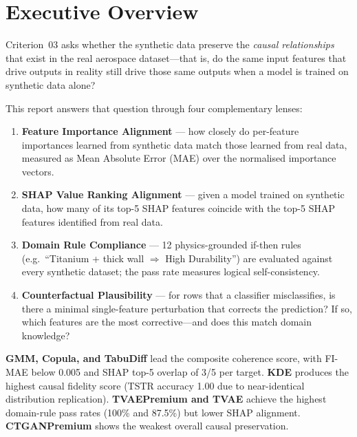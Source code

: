 \documentclass[12pt,a4paper]{article}
\begin{document}
\tableofcontents
\newpage

\section{Executive Overview}

Criterion~03 asks whether the synthetic data preserve the \emph{causal relationships} that exist in the real aerospace dataset---that is, do the same input features that drive outputs in reality still drive those same outputs when a model is trained on synthetic data alone?

This report answers that question through four complementary lenses:

\begin{enumerate}[leftmargin=1.5cm]
  \item \textbf{Feature Importance Alignment} --- how closely do per-feature importances learned from synthetic data match those learned from real data, measured as Mean Absolute Error (MAE) over the normalised importance vectors.
  \item \textbf{SHAP Value Ranking Alignment} --- given a model trained on synthetic data, how many of its top-5 SHAP features coincide with the top-5 SHAP features identified from real data.
  \item \textbf{Domain Rule Compliance} --- 12 physics-grounded if-then rules (e.g.\ ``Titanium + thick wall $\Rightarrow$ High Durability'') are evaluated against every synthetic dataset; the pass rate measures logical self-consistency.
  \item \textbf{Counterfactual Plausibility} --- for rows that a classifier misclassifies, is there a minimal single-feature perturbation that corrects the prediction? If so, which features are the most corrective---and does this match domain knowledge?
\end{enumerate}

\begin{tcolorbox}[successbox, title={Headline Finding}]
\textbf{GMM, Copula, and TabuDiff} lead the composite coherence score, with FI-MAE below 0.005 and SHAP top-5 overlap of 3/5 per target. \textbf{KDE} produces the highest causal fidelity score (TSTR accuracy 1.00 due to near-identical distribution replication). \textbf{TVAEPremium and TVAE} achieve the highest domain-rule pass rates (100\% and 87.5\%) but lower SHAP alignment. \textbf{CTGANPremium} shows the weakest overall causal preservation.
\end{tcolorbox}
\end{document}
